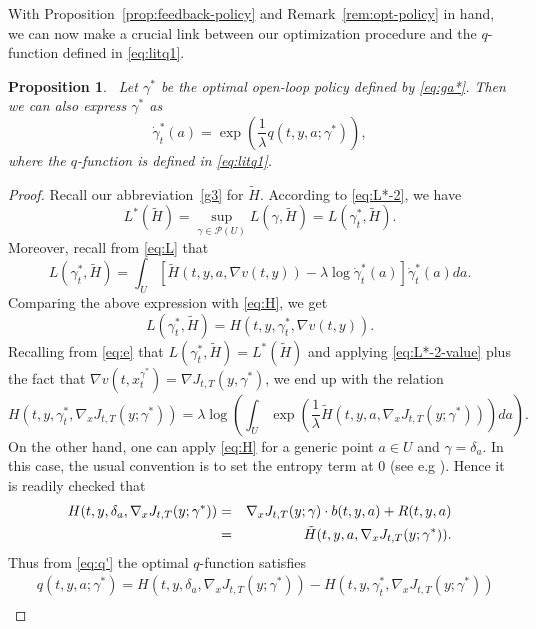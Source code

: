 \documentclass[12pt,reqno]{amsart}
\numberwithin{equation}{section}  %
\newcommand{\der}{\delta}
\newcommand{\1}{{\bf 1}}
\newcommand{\2}{{\bf 2}}
\newcommand{\cp}{\mathcal P}
\newcommand{\ga}{\gamma}
\newcommand{\la}{\lambda}
\newcommand{\lp}{\left(}
\newcommand{\rp}{\right)}
\newcommand{\lc}{\left[}
\newcommand{\rc}{\right]}
\newtheorem{proposition}[theorem]{Proposition}
\theoremstyle{remark}
\theoremstyle{remark}
\newcommand{\beq}{\begin{equation}}
\newcommand{\eeq}{\end{equation}}
\begin{document}
With Proposition~\ref{prop:feedback-policy} and 
Remark~\ref{rem:opt-policy} in hand, we can now make a crucial link between our optimization procedure and  the $q$-function defined in \eqref{eq:litq1}.
\begin{proposition} ~\label{prop:closed-gibbs-q}
Let $\ga^{\ast}$ be the optimal open-loop policy defined by \eqref{eq:ga*}. Then we can also express $\ga^{\ast}$ as
\beq\label{eq:ga*-q}
\dot\ga_t^{\ast}(a) = \exp \lp \dfrac{1}{\la} q(t,y,a; \ga^{\ast}) \rp,
\eeq
where the $q$-function is defined in \eqref{eq:litq1}.
\end{proposition}
\begin{proof}
Recall our abbreviation~\eqref{g3} for $\tilde{H}$.
According to \eqref{eq:L*-2}, we have
\beq\label{eq:e}
L^{\ast} (\tilde H) = \sup_{\ga \in \cp(U)} L(\ga, \tilde H) = L(\ga_t^{\ast}, \tilde H).
\eeq
Moreover, recall from \eqref{eq:L} that
$$
L(\ga_t^{\ast}, \tilde H) 
= \int_U \lc \tilde H(t,y,a,\nabla v(t,y)) - \lambda \log \dot{\ga}_t^{\ast}(a) \rc \dot{\ga}_t^{\ast}(a) da. 
$$
Comparing the above expression with \eqref{eq:H}, we get
$$
L(\ga_t^{\ast}, \tilde H) = H(t, y, \ga_t^{\ast}, \nabla v(t,y)) .
$$
Recalling from \eqref{eq:e} that $L(\ga_t^{\ast}, \tilde H) = L^{\ast}(\tilde H)$ and applying \eqref{eq:L*-2-value} plus the fact that $\nabla v (t,x_{t}^{\ga^{*}})=\nabla J_{t,T}(y,\ga^{*})$, we end up with the relation 
\beq\label{eq:H-opt}
H(t,y, \ga_t^{\ast}, \nabla_x J_{t,T}(y; \ga^{\ast})) = \la \log \lp \int_U \exp\lp \frac{1}{\la} \tilde{H}(t,y,a,\nabla_x J_{t,T}(y;\ga^{\ast})) \rp da \rp.
\eeq
On the other hand, one can apply \eqref{eq:H} for a generic point $a \in U$ and $\ga = \der_a$. In this case, the usual convention is to set the entropy term at 0 (see e.g \cite{jia2023qlearning}). Hence it is readily checked that 
\begin{eqnarray}\label{H-opt-a}
H(t,y,\der_a, \nabla_x J_{t,T}(y ; \ga^{\ast})) 
&=& 
\nabla_x J_{t,T}(y;\ga) \cdot b(t,y,a) + R(t,y,a) \notag\\
&=& \tilde{H}(t,y,a,\nabla_x J_{t,T}(y ; \ga^{\ast})) .
\end{eqnarray}
Thus from \eqref{eq:q'} the optimal $q$-function satisfies
\begin{align}\label{eq:f}
&q(t,y,a;\ga^{\ast}) = H(t,y,\der_a, \nabla_x J_{t,T}(y ; \ga^{\ast})) - H(t, y, \ga_t^{*}, \nabla_x J_{t,T}(y;\ga^{\ast})) \nonumber \\

\end{align}
\end{proof}
\end{document}
